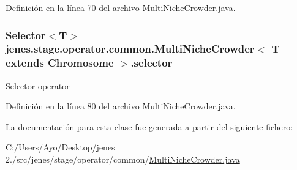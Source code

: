 Definición en la línea 70 del archivo Multi\-Niche\-Crowder.\-java.

\hypertarget{classjenes_1_1stage_1_1operator_1_1common_1_1_multi_niche_crowder_3_01_t_01extends_01_chromosome_01_4_aec9f82fc79b7a63f5e664dfbcc7e9563}{
\subsubsection[{selector}]{\setlength{\rightskip}{0pt plus 5cm}Selector$<$T$>$ jenes.\-stage.\-operator.\-common.\-Multi\-Niche\-Crowder$<$ T extends Chromosome $>$.selector\hspace{0.3cm}{\ttfamily [protected]}}}\label{classjenes_1_1stage_1_1operator_1_1common_1_1_multi_niche_crowder_3_01_t_01extends_01_chromosome_01_4_aec9f82fc79b7a63f5e664dfbcc7e9563}
Selector operator 

Definición en la línea 80 del archivo Multi\-Niche\-Crowder.\-java.



La documentación para esta clase fue generada a partir del siguiente fichero\-:\begin{DoxyCompactItemize}
\item 
C\-:/\-Users/\-Ayo/\-Desktop/jenes 2./src/jenes/stage/operator/common/\hyperlink{_multi_niche_crowder_8java}{Multi\-Niche\-Crowder.\-java}\end{DoxyCompactItemize}
